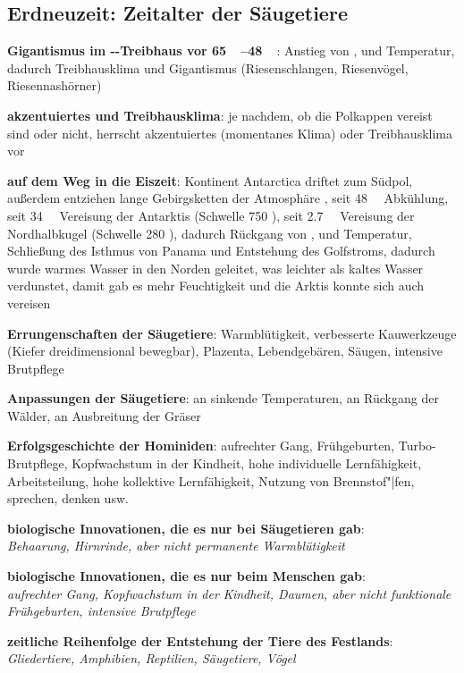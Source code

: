 \pagebreak

\subsection{%
    Erdneuzeit: Zeitalter der Säugetiere%
}

\textbf{Gigantismus im --Treibhaus vor \SIrange{65}{48}{\mega\year}}:
Anstieg von ,  und Temperatur,
dadurch Treibhausklima und Gigantismus
(Riesenschlangen, Riesenvögel, Riesennashörner)

\textbf{akzentuiertes und Treibhausklima}:
je nachdem, ob die Polkappen vereist sind oder nicht,
herrscht akzentuiertes (momentanes Klima) oder Treibhausklima vor

\textbf{auf dem Weg in die Eiszeit}:
Kontinent Antarctica driftet zum Südpol,
außerdem entziehen lange Gebirgsketten der Atmosphäre ,
seit \SI{48}{\mega\year} Abkühlung,
seit \SI{34}{\mega\year} Vereisung der Antarktis (Schwelle \SI{750}{\ppm} ),
seit \SI{2.7}{\mega\year} Vereisung der Nordhalbkugel (Schwelle \SI{280}{\ppm} ),
dadurch Rückgang von ,  und Temperatur,
Schließung des Isthmus von Panama und Entstehung des Golfstroms,
dadurch wurde warmes Wasser in den Norden geleitet, was leichter als kaltes Wasser verdunstet,
damit gab es mehr Feuchtigkeit und die Arktis konnte sich auch vereisen

\textbf{Errungenschaften der Säugetiere}:
Warmblütigkeit,
verbesserte Kauwerkzeuge (Kiefer dreidimensional bewegbar),
Plazenta,
Lebendgebären,
Säugen,
intensive Brutpflege

\textbf{Anpassungen der Säugetiere}:
an sinkende Temperaturen,
an Rückgang der Wälder,
an Ausbreitung der Gräser

\textbf{Erfolgsgeschichte der Hominiden}:
aufrechter Gang, Frühgeburten, Turbo-Brutpflege,
Kopfwachstum in der Kindheit, hohe individuelle Lernfähigkeit,
Arbeitsteilung, hohe kollektive Lernfähigkeit, Nutzung von Brennstof"|fen,
sprechen, denken usw.

\begin{wichtig}
    \item
    \textbf{biologische Innovationen, die es nur bei Säugetieren gab}:\\
    \emph{Behaarung, Hirnrinde, aber nicht permanente Warmblütigkeit}
    
    \item
    \textbf{biologische Innovationen, die es nur beim Menschen gab}:\\
    \emph{aufrechter Gang, Kopfwachstum in der Kindheit, Daumen,
    aber nicht funktionale Frühgeburten, intensive Brutpflege}
    
    \item
    \textbf{zeitliche Reihenfolge der Entstehung der Tiere des Festlands}:\\
    \emph{Gliedertiere, Amphibien, Reptilien, Säugetiere, Vögel}
\end{wichtig}

